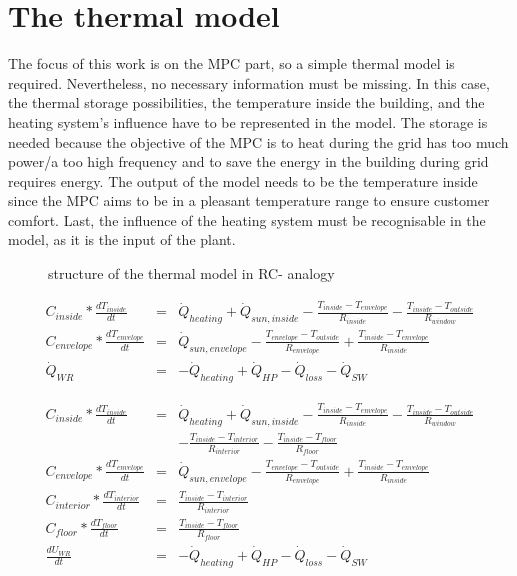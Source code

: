 \section{The thermal model}
\label{thermalmodel}

    The focus of this work is on the MPC part, so a simple thermal model is required. Nevertheless, no necessary information must be missing. In this case, the thermal storage possibilities, the temperature inside the building, and the heating system's influence have to be represented in the model. The storage is needed because the objective of the MPC is to heat during the grid has too much power/a too high frequency and to save the energy in the building during grid requires energy. The output of the model needs to be the temperature inside since the MPC aims to be in a pleasant temperature range to ensure customer comfort. Last, the influence of the heating system must be recognisable in the model, as it is the input of the plant. 
    \newline
    \begin{figure}
        \centering
        \def\svgwidth{320pt}
        
        \caption{structure of the thermal model in RC- analogy}
        \label{fig:structureThermalModel}
    \end{figure}
    \begin{align}
       \label{eq:meinModel} 
       C_{inside}*\frac{d T_{inside}}{d t} &=& \dot{Q}_{heating} + \dot{Q}_{sun,inside} - \frac{T_{inside}-T_{envelope}}{R_{inside}} - \frac{T_{inside}-T_{outside}}{R_{window}}\\
       C_{envelope}*\frac{d T_{envelope}}{d t} &=& \dot{Q}_{sun,envelope} - \frac{T_{envelope}-T_{outside}}{R_{envelope}} + \frac{T_{inside}-T_{envelope}}{R_{inside}} \nonumber \\
       \dot{Q}_{WR}&=& -\dot{Q}_{heating} + \dot{Q}_{HP} - \dot{Q}_{loss} - \dot{Q}_{SW} \nonumber
    \end{align}
    
    \begin{align}
       \label{eq:meinModel2} 
       C_{inside}*\frac{d T_{inside}}{d t} &=& \dot{Q}_{heating} + \dot{Q}_{sun,inside} - \frac{T_{inside}-T_{envelope}}{R_{inside}} - \frac{T_{inside}-T_{outside}}{R_{window}} \nonumber\\
       & &-\frac{T_{inside}-T_{interior}}{R_{interior}}-\frac{T_{inside}-T_{floor}}{R_{floor}} \nonumber\\
       C_{envelope}*\frac{d T_{envelope}}{d t} &=& \dot{Q}_{sun,envelope} - \frac{T_{envelope}-T_{outside}}{R_{envelope}} + \frac{T_{inside}-T_{envelope}}{R_{inside}} \nonumber \\
       C_{interior}*\frac{d T_{interior}}{d t} &=& \frac{T_{inside}-T_{interior}}{R_{interior}} \nonumber\\
       C_{floor}*\frac{d T_{floor}}{d t} &=& \frac{T_{inside}-T_{floor}}{R_{floor}} \nonumber\\
       \frac{d U_{WR}}{d t}&=& -\dot{Q}_{heating} + \dot{Q}_{HP} - \dot{Q}_{loss} - \dot{Q}_{SW} \nonumber
    \end{align}

